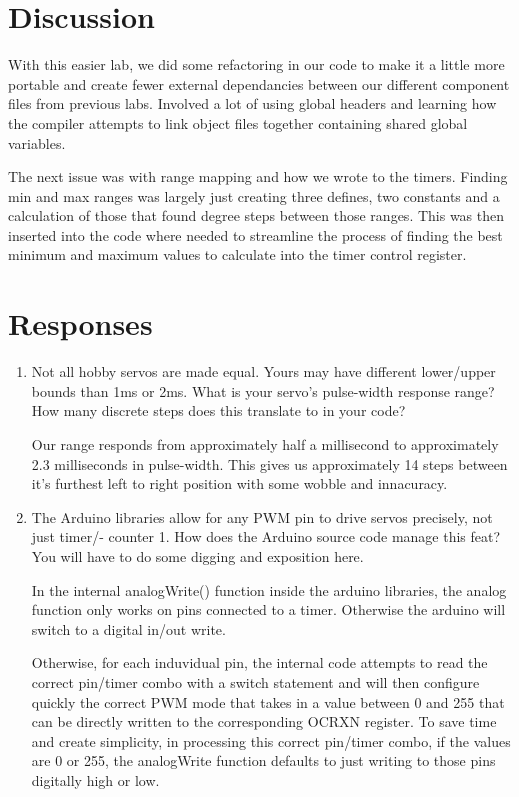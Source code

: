 \documentclass[letterpaper,11pt]{texMemo} %
\begin{document}
\section*{Discussion}
With this easier lab, we did some refactoring in our code to make it a little more portable 
and create fewer external dependancies between our different component files from previous labs.
Involved a lot of using global headers and learning how the compiler attempts to link object files
 together containing shared global variables.

The next issue was with range mapping and how we wrote to the timers. Finding min and max ranges 
was largely just creating three defines, two constants and a calculation of those that found degree steps 
between those ranges. This was then inserted into the code where needed to streamline the process of finding 
the best minimum and maximum values to calculate into the timer control register.

\section*{Responses}
\begin{enumerate}
\item Not all hobby servos are made equal. Yours may have different lower/upper bounds than
1ms or 2ms. What is your servo’s pulse-width response range? How many discrete steps
does this translate to in your code?

Our range responds from approximately half a millisecond to approximately 2.3 milliseconds in pulse-width.
This gives us approximately 14 steps between it's furthest left to right position with some wobble and 
innacuracy.

\item  The Arduino libraries allow for any PWM pin to drive servos precisely, not just timer/-
counter 1. How does the Arduino source code manage this feat? You will have to do some
digging and exposition here.

In the internal analogWrite() function inside the arduino libraries, the analog function only works 
on pins connected to a timer. Otherwise the arduino will switch to a digital in/out write.

Otherwise, for each induvidual pin, the internal code attempts to read the correct pin/timer combo 
with a switch statement and will then configure quickly the correct PWM mode that takes in a 
value between 0 and 255 that can be directly written to the corresponding OCRXN register. To save time 
and create simplicity, in processing this correct pin/timer combo, if the values are 0 or 255, 
the analogWrite function defaults to just writing to those pins digitally high or low.


\end{enumerate} 
\end{document}
